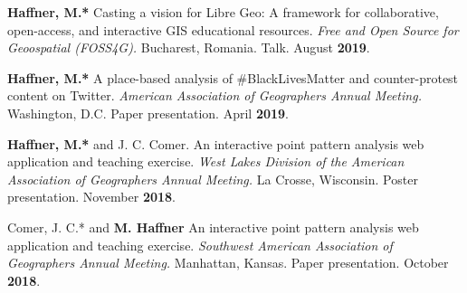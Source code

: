 \begin{cventries}
  \cventry
  {}
  {}
  {}
  {}
  {
    \begin{cvitems}
      \vspace{-2mm}
    \item {\textbf{Haffner, M.*} Casting a vision for Libre Geo: A framework for
        collaborative, open-access, and interactive GIS educational resources.
        \textit{Free and Open Source for Geoospatial (FOSS4G).} Bucharest, Romania.
        Talk. August \textbf{2019}.}
    \end{cvitems}
  } %

  \cventry
  {}
  {}
  {}
  {}
  {
    \begin{cvitems}
      \vspace{-2mm}
    \item {\textbf{Haffner, M.*} A place-based analysis of \#BlackLivesMatter
        and counter-protest content on Twitter.
        \textit{American Association of Geographers Annual Meeting.} Washington, D.C.
        Paper presentation. April \textbf{2019}.}
    \end{cvitems}
  } %

   \cventry
      {}
      {}
      {}
      {}
      {
        \begin{cvitems}
          \vspace{-2mm}
        \item {\textbf{Haffner, M.*} and J. C. Comer.  An interactive
            point pattern analysis web application and teaching exercise.
             \textit{West Lakes Division of the American Association of Geographers Annual
               Meeting.} La Crosse, Wisconsin.
            Poster presentation. November \textbf{2018}.}
          \end{cvitems}
        } %

   \cventry
      {}
      {}
      {}
      {}
      {
        \begin{cvitems}
          \vspace{-2mm}
        \item {Comer, J. C.* and \textbf{M. Haffner} An interactive
            point pattern analysis web application and teaching exercise.
             \textit{Southwest American Association of Geographers Annual
               Meeting.} Manhattan, Kansas.
            Paper presentation. October \textbf{2018}.}
          \end{cvitems}
        } %


\end{cventries}
